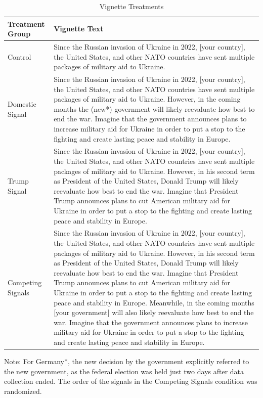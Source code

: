 \setlength{\parindent}{1em} %
\begin{table}[H]
\centering
\footnotesize
\begin{tabular}{|p{2cm}|p{12cm}|}  %
\hline
\textbf{Treatment Group} & \textbf{Vignette Text} \\
\hline
Control & Since the Russian invasion of Ukraine in 2022, [your country], the United States, and other NATO countries have sent multiple packages of military aid to Ukraine. \\
\hline
Domestic Signal & Since the Russian invasion of Ukraine in 2022, [your country], the United States, and other NATO countries have sent multiple packages of military aid to Ukraine. However, in the coming months the (new*) government will likely reevaluate how best to end the war. Imagine that the government announces plans to increase military aid for Ukraine in order to put a stop to the fighting and create lasting peace and stability in Europe. \\
\hline
Trump Signal & Since the Russian invasion of Ukraine in 2022, [your country], the United States, and other NATO countries have sent multiple packages of military aid to Ukraine. However, in his second term as President of the United States, Donald Trump will likely reevaluate how best to end the war. Imagine that President Trump announces plans to cut American military aid for Ukraine in order to put a stop to the fighting and create lasting peace and stability in Europe. \\
\hline
Competing Signals & Since the Russian invasion of Ukraine in 2022, [your country], the United States, and other NATO countries have sent multiple packages of military aid to Ukraine. However, in his second term as President of the United States, Donald Trump will likely reevaluate how best to end the war. Imagine that President Trump announces plans to cut American military aid for Ukraine in order to put a stop to the fighting and create lasting peace and stability in Europe. Meanwhile, in the coming months [your government] will also likely reevaluate how best to end the war. Imagine that the government announces plans to increase military aid for Ukraine in order to put a stop to the fighting and create lasting peace and stability in Europe. \\
\hline
\end{tabular}
\caption{Vignette Treatments}
\label{fig:treatment_table}
{\scriptsize {Note: For Germany*, the new decision by the government explicitly referred to the new government, as the federal election was held just two days after data collection ended. The order of the signals in the Competing Signals condition was randomized.}}
\end{table}

